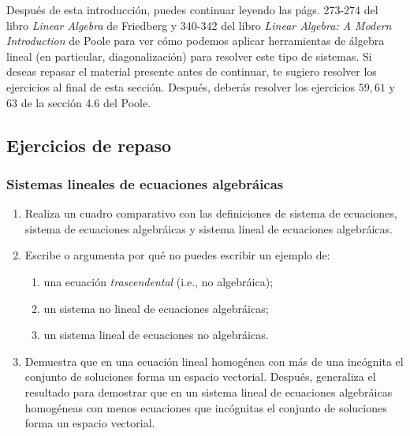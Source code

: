 \documentclass[12pt,dvipsnames]{article}
\begin{document}
Después de esta introducción, puedes continuar leyendo las págs. 273-274 del libro \emph{Linear Algebra} de Friedberg y 340-342 del libro \emph{Linear Algebra: A Modern Introduction} de Poole para ver cómo podemos aplicar herramientas de álgebra lineal (en particular, diagonalización) para resolver este tipo de sistemas. Si deseas repasar el material presente antes de continuar, te sugiero resolver los ejercicios al final de esta sección. Después, deberás resolver los ejercicios $59, 61$ y $63$ de la sección 4.6 del Poole.

\subsection{Ejercicios de repaso}

\subsubsection{Sistemas lineales de ecuaciones algebráicas}
\begin{enumerate}
    \item Realiza un cuadro comparativo con las definiciones de sistema de ecuaciones, sistema de ecuaciones algebráicas y sistema lineal de ecuaciones algebráicas. 
    \item Escribe o argumenta por qué no puedes escribir un ejemplo de:
    \begin{enumerate}[label=\alph*)]
        \item una ecuación \emph{trascendental} (i.e., no algebráica);
        \item un sistema no lineal de ecuaciones algebráicas;
        \item un sistema lineal de ecuaciones no algebráicas.
    \end{enumerate}
    \item Demuestra que en una ecuación lineal homogénea con más de una incógnita el conjunto de soluciones forma un espacio vectorial. Después, generaliza el resultado para demostrar que en un sistema lineal de ecuaciones algebráicas homogéneas con menos ecuaciones que incógnitas el conjunto de soluciones forma un espacio vectorial.
\end{enumerate}
\end{document}
